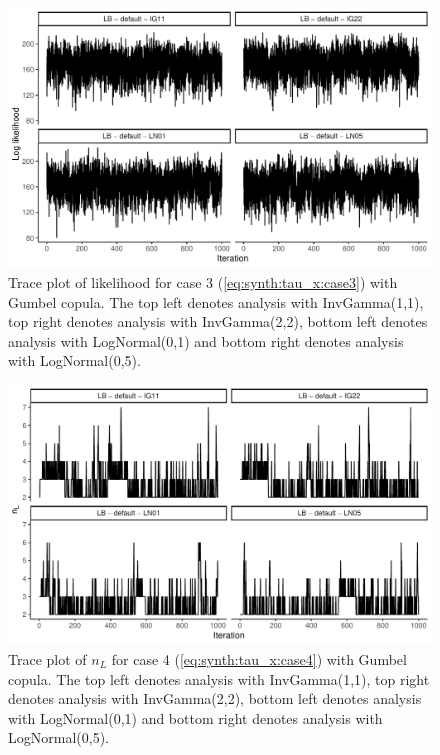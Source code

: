 \documentclass{amsart}
\begin{document}
\begin{figure}
	\centering
	\includegraphics[width = 0.75\linewidth]{trace_case3_gumbel_like.pdf}
	\caption{Trace plot of likelihood for case 3 (\cref{eq:synth:tau_x:case3}) with Gumbel copula. The top left denotes analysis with InvGamma(1,1), top right denotes analysis with InvGamma(2,2), bottom left denotes analysis with LogNormal(0,1) and bottom right denotes analysis with LogNormal(0,5).}
	\label{fig:case3:gumbel:like}
\end{figure}

\begin{figure}
	\centering
	\includegraphics[width = 0.75\linewidth]{trace_case4_gumbel_nterm.pdf}
	\caption{Trace plot of $n_L$ for case 4 (\cref{eq:synth:tau_x:case4}) with Gumbel copula. The top left denotes analysis with InvGamma(1,1), top right denotes analysis with InvGamma(2,2), bottom left denotes analysis with LogNormal(0,1) and bottom right denotes analysis with LogNormal(0,5).}
	\label{fig:case4:gumbel:nterm}
\end{figure}
\end{document}
